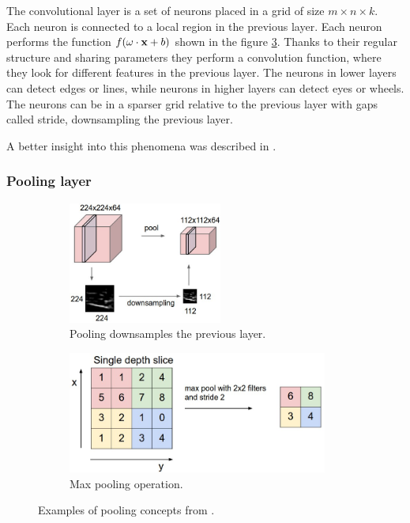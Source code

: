 \documentclass[a4paper,11pt,titlepage,twoside]{article}
\numberwithin{figure}{section}
\begin{document}
The convolutional layer is a set of neurons placed in a grid of size $m \times n \times k$. Each neuron is connected to a local region in the previous layer. Each neuron performs the function $f(\bold{\omega} \cdot \bold{x} + b)$ shown in the figure \ref{fig:neuron}. Thanks to their regular structure and sharing parameters they perform a convolution function, where they look for different features in the previous layer. The neurons in lower layers can detect edges or lines, while neurons in higher layers can detect eyes or wheels. The neurons can be in a sparser grid relative to the previous layer with gaps called stride, downsampling the previous layer. 

A better insight into this phenomena was described in \cite{zeiler2014visualizing}.

\subsubsection{Pooling layer}
\begin{figure}[h!]
    \begin{subfigure}[Sample1]{0.5\linewidth}
        \includegraphics[height=40mm]{fig/pool1.jpeg} 
        \caption{Pooling downsamples the previous layer.}
        \label{fig:conv_layer}
    \end{subfigure}
    \begin{subfigure}[Sample1]{0.5\linewidth} 
        \includegraphics[height=40mm]{fig/pool2.jpeg}
        \caption{Max pooling operation.}   
        \label{fig:neuron}
    \end{subfigure} 
    \caption{Examples of pooling concepts from \cite{karpathy2016cs231n}.}
\end{figure}
\end{document}
